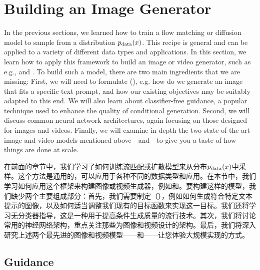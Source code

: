 \section{Building an Image Generator}
\label{sec:image_generation}

In the previous sections, we learned how to train a flow matching or diffusion model to sample from a distribution $p_{\rm{data}}(x)$. This recipe is general and can be applied to a variety of different data types and applications. In this section, we learn how to apply this framework to build an image or video generator, such as e.g.,  and . To build such a model, there are two main ingredients that we are missing: First, we will need to formulate  (), e.g. how do we generate an image that fits a specific text prompt, and how our existing objectives may be suitably adapted to this end. We will also learn about classifier-free guidance, a popular technique used to enhance the quality of conditional generation. Second, we will discuss common neural network architectures, again focusing on those designed for images and videos. Finally, we will examine in depth the two state-of-the-art image and video models mentioned above -  and  - to give you a taste of how things are done at scale.

在前面的章节中，我们学习了如何训练流匹配或扩散模型来从分布$p_{\rm{data}}(x)$中采样。这个方法是通用的，可以应用于各种不同的数据类型和应用。在本节中，我们学习如何应用这个框架来构建图像或视频生成器，例如和。要构建这样的模型，我们缺少两个主要组成部分：首先，我们需要制定（），例如如何生成符合特定文本提示的图像，以及如何适当调整我们现有的目标函数来实现这一目标。我们还将学习无分类器指导，这是一种用于提高条件生成质量的流行技术。其次，我们将讨论常用的神经网络架构，重点关注那些为图像和视频设计的架构。最后，我们将深入研究上述两个最先进的图像和视频模型——和——让您体验大规模实现的方式。

\subsection{Guidance}

